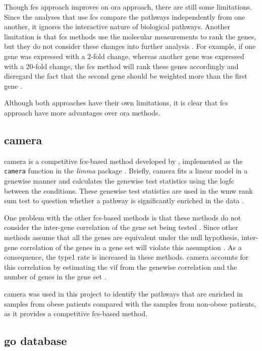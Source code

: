 Though \gls{fcs} approach improves on \gls{ora} approach, there are still some limitations.
Since the analyses that use \gls{fcs} compare the pathways independently from one another, it ignores the interactive nature of biological pathways.
Another limitation is that \gls{fcs} methods use the molecular measurements to rank the genes, but they do not consider these changes into further analysis \citep{Khatri2012}.
For example, if one gene was expressed with a 2-fold change, whereas another gene was expressed with a 20-fold change, the \gls{fcs} method will rank these genes accordingly and disregard the fact that the second gene should be weighted more than the first gene \citep{Khatri2012}.

Although both approaches have their own limitations, it is clear that \gls{fcs} approach have more advantages over \gls{ora} methods.

\subsection{\Gls{camera}}
\label{sub:camera}

\Acrfull{camera} is a competitive \gls{fcs}-based method developed by \citet{Wu2012}, implemented as the \texttt{camera} function in the \textit{limma} package \citep{Ritchie2015}.
Briefly, \gls{camera} fits a linear model in a genewise manner and calculates the genewise test statistics using the log\gls{fc} between the conditions.
These genewise test statistics are used in the \gls{wmw} rank sum test to question whether a pathway is significantly enriched in the data \citep{Wu2012}.

One problem with the other \gls{fcs}-based methods is that these methods do not consider the inter-gene correlation of the gene set being tested \citep{Wu2012}.
Since other methods assume that all the genes are equivalent under the null hypothesis, inter-gene correlation of the genes in a gene set will violate this assumption \citep{Wu2012}.
As a consequence, the \gls{type1} rate is increased in these methods.
\Gls{camera} accounts for this correlation by estimating the \gls{vif} from the genewise correlation and the number of genes in the gene set \citep{Wu2012}.

\gls{camera} was used in this project to identify the pathways that are enriched in samples from obese patients compared with the samples from non-obese patients, as it provides a competitive \gls{fcs}-based method.

\subsection{\gls{go} database}
\label{sub:go_database}


